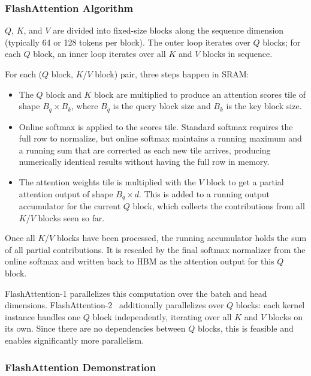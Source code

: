 \subsubsection{FlashAttention Algorithm}
\label{sec:flashattention_algorithm}

$Q$, $K$, and $V$ are divided into fixed-size blocks along the sequence dimension (typically 64 or 128 tokens per block). The outer loop iterates over $Q$ blocks; for each $Q$ block, an inner loop iterates over all $K$ and $V$ blocks in sequence.

For each ($Q$ block, $K$/$V$ block) pair, three steps happen in SRAM:

\begin{itemize}
    \item The $Q$ block and $K$ block are multiplied to produce an attention scores tile of shape $B_q \times B_k$, where $B_q$ is the query block size and $B_k$ is the key block size.
    \item Online softmax is applied to the scores tile. Standard softmax requires the full row to normalize, but online softmax maintains a running maximum and a running sum that are corrected as each new tile arrives, producing numerically identical results without having the full row in memory.
    \item The attention weights tile is multiplied with the $V$ block to get a partial attention output of shape $B_q \times d$. This is added to a running output accumulator for the current $Q$ block, which collects the contributions from all $K$/$V$ blocks seen so far.
\end{itemize}

Once all $K$/$V$ blocks have been processed, the running accumulator holds the sum of all partial contributions. It is rescaled by the final softmax normalizer from the online softmax and written back to HBM as the attention output for this $Q$ block.

FlashAttention-1 parallelizes this computation over the batch and head dimensions. FlashAttention-2~\cite{dao2023flashattention2} additionally parallelizes over $Q$ blocks: each kernel instance handles one $Q$ block independently, iterating over all $K$ and $V$ blocks on its own. Since there are no dependencies between $Q$ blocks, this is feasible and enables significantly more parallelism.

\subsubsection{FlashAttention Demonstration}

